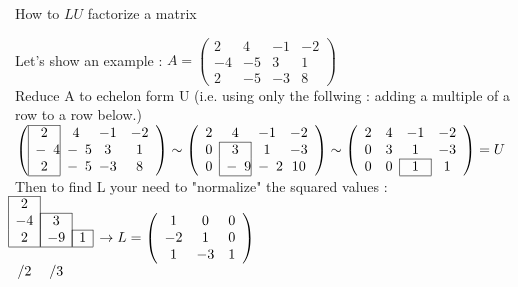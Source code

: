 \documentclass[12pt]{article}
\newcommand*{\xfield}[1]{\begin{mdframed}\centering #1\end{mdframed}\bigskip}
\newenvironment{note}{}{}
\begin{document}
\begin{note}
\xfield{How to $LU$ factorize a matrix}
\xfield{Let's show an example : $A =  \left(
    \begin{array}{cccc}
      2&4&-1&-2\\
      -4&-5&3&1\\
      2&-5&-3&8
    \end{array}
  \right)$ \\
  Reduce A to echelon form U (i.e. using only the follwing : adding a multiple of a row to a row below.)\\
$\left(
    \begin{array}{cccc}
      \cline{1-1}
      \multicolumn{1}{|c}2&\multicolumn{1}{|c}4&-1&-2\\
      \multicolumn{1}{|c}-4&\multicolumn{1}{|c}-5&3&1\\
      \multicolumn{1}{|c}2&\multicolumn{1}{|c}-5&-3&8\\
      \cline{1-1}
    \end{array}
  \right) \sim \left(
    \begin{array}{cccc}
      2&4&-1&-2\\
      \cline{2-2}
      0&\multicolumn{1}{|c}3&\multicolumn{1}{|c}1&-3\\
      0&\multicolumn{1}{|c}-9&\multicolumn{1}{|c}-2&10\\
      \cline{2-2}
    \end{array}
  \right) \sim \left(
    \begin{array}{cccc}
      2&4&-1&-2\\
      0&3&1&-3\\
      \cline{3-3}
      0&0&\multicolumn{1}{|c}1&\multicolumn{1}{|c}1\\
      \cline{3-3}
    \end{array} 
  \right) = U$ \\
  Then to find L your need to "normalize" the squared values : $\begin{matrix}
  \cline{1-1}
\multicolumn{1}{|c|}2 &\\
\cline{2-2}
\multicolumn{1}{|c|}{-4} & \multicolumn{1}{|c|}3 \\ 
\cline{3-3}
\multicolumn{1}{|c|}2 &\multicolumn{1}{|c|} {-9} &\multicolumn{1}{|c|} 1\\
\cline{1-3}\\
/2 & /3
\end{matrix}\ \ \rightarrow L = \left(
    \begin{array}{ccc}
      1&0&0\\
      -2&1&0\\
      1&-3&1
    \end{array}
  \right)$ }
\end{note}
\end{document}
